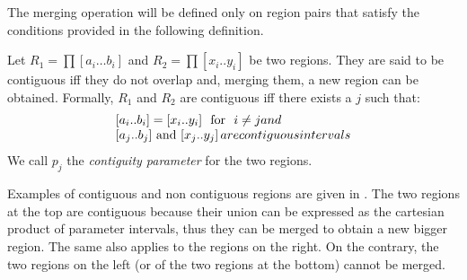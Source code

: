 	\begin{figure}[t]
		\begin{center}
		\end{center}
	\end{figure}


The merging operation will be defined only on region pairs that satisfy the conditions provided in the following definition.
\begin{definition}Let $R_{1}=\prod\left[a_{i}\dots b_{i}\right]$ and $R_{2}=\prod\left[x_{i}..y_{i}\right]$
be two regions. They are said to be contiguous iff they do not overlap and, merging them, a new region can be obtained. Formally, $R_1$ and $R_2$ are contiguous iff there exists a $j$ such that:
	\begin{align}\begin{array}{l}
		\left[a_{i}..b_{i}\right]=\left[x_{i}..y_{i}\right]$
	\mbox{ for } $i\neq j \mbox{      and} \\
		\left[a_{j}..b_{j}\right]$ and $\left[x_{j}..y_{j}\right] \mbox{ are contiguous intervals}
	\end{array}\end{align}
\noindent We call $p_j$ the \emph{contiguity parameter} for the two regions.
\end{definition}

Examples of contiguous and non contiguous regions are given in . The two regions at the top are contiguous because their union can be expressed as the cartesian product of parameter intervals, thus they can be merged to obtain a new bigger region. The same also applies to the regions on the right. On the contrary, the two regions on the left (or of the two regions at the bottom) cannot be merged. 

